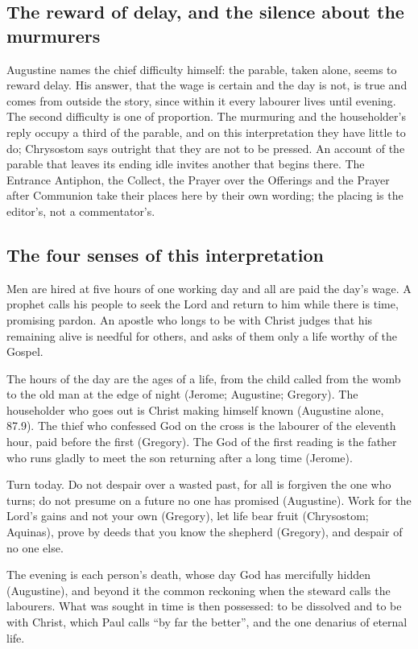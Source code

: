 \subsection{The reward of delay, and the silence about the murmurers}

Augustine names the chief difficulty himself: the parable, taken alone, seems
to reward delay. His answer, that the wage is certain and the day is not, is
true and comes from outside the story, since within it every labourer lives
until evening. The second difficulty is one of proportion. The murmuring and
the householder's reply occupy a third of the parable, and on this
interpretation they have little to do; Chrysostom says outright that they are
not to be pressed. An account of the parable that leaves its ending idle
invites another that begins there. The Entrance Antiphon, the Collect, the
Prayer over the Offerings and the Prayer after Communion take their places
here by their own wording; the placing is the editor's, not a
commentator's.

\subsection{The four senses of this interpretation}

\begin{fourSenses}
\item[Literal.] Men are hired at five hours of one working day and all are
paid the day's wage. A prophet calls his people to seek the Lord and return to
him while there is time, promising pardon. An apostle who longs to be with
Christ judges that his remaining alive is needful for others, and asks of them
only a life worthy of the Gospel.

\item[Allegorical.] The hours of the day are the ages of a life, from the
child called from the womb to the old man at the edge of night (Jerome;
Augustine; Gregory). The householder who goes out is Christ making himself
known (Augustine alone,  87.9). The thief who confessed God on the
cross is the labourer of the eleventh hour, paid before the first (Gregory).
The God of
the first reading is the father who runs gladly to meet the son returning
after a long time (Jerome).

\item[Moral.] Turn today. Do not despair over a wasted past, for all is
forgiven the one who turns; do not presume on a future no one has promised
(Augustine). Work for the Lord's gains and not your own (Gregory), let life
bear fruit (Chrysostom; Aquinas), prove by deeds that you know the shepherd
(Gregory), and despair of no one else.

\item[Anagogical.] The evening is each person's death, whose day God has
mercifully hidden (Augustine), and beyond it the common reckoning when the
steward calls the labourers. What was sought in time is then possessed: to be
dissolved and to be with Christ, which Paul calls ``by far the better'', and
the one denarius of eternal life.
\end{fourSenses}
